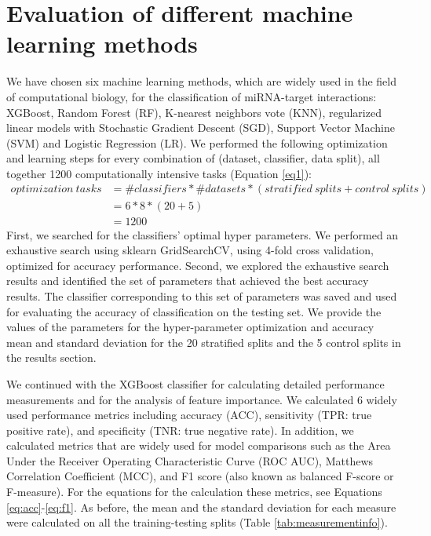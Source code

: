 \section{Evaluation of different machine learning methods} \label{method_ml_methods}
We have chosen six machine learning methods, which are widely used in the field of computational biology, for the classification of miRNA-target interactions: XGBoost\cite{xgboost}, Random Forest (RF), K-nearest neighbors vote (KNN), regularized linear models with Stochastic Gradient Descent (SGD), Support Vector Machine (SVM) and Logistic Regression (LR).
We performed the following optimization and learning steps for every combination of (dataset, classifier, data split), all together 1200 computationally intensive tasks (Equation \ref{eq1}):
\begin{equation} \label{eq1}
\begin{split}
optimization \: tasks & = \#classifiers * \#datasets * \left (stratified\: splits + control\: splits \right ) \\
 & = 6*8*( 20 + 5 ) \\
 & = 1200
\end{split}
\end{equation}
First, we searched for the classifiers' optimal hyper parameters. We performed an exhaustive search using sklearn GridSearchCV, using 4-fold cross validation, optimized for accuracy performance. Second, we explored the exhaustive search results and identified the set of parameters that achieved the best accuracy results. The classifier corresponding to this set of parameters was saved and used for evaluating the accuracy of classification on the testing set. We provide the values of the parameters for the hyper-parameter optimization and accuracy mean and standard deviation for the 20 stratified splits and the 5 control splits in the results section.

We continued with the XGBoost classifier for calculating detailed performance measurements and for the analysis of feature importance. We calculated 6 widely used performance metrics including accuracy (ACC), sensitivity (TPR: true positive rate), and specificity (TNR: true negative rate). In addition, we calculated metrics that are widely used for model comparisons such as the Area Under the Receiver Operating Characteristic Curve (ROC AUC), Matthews Correlation Coefficient (MCC), and F1 score (also known as balanced F-score or F-measure). For the equations for the calculation these metrics, see Equations \ref{eq:acc}-\ref{eq:f1}.
As before, the mean and the standard deviation for each measure were calculated on all the training-testing splits (Table \ref{tab:measurementinfo}).



